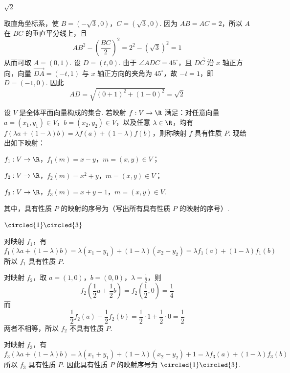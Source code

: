 \begin{answer}
\(\sqrt{2}\)
\end{answer}

\begin{solution}
取直角坐标系，使 \(B=(-\sqrt{3},0)\)，\(C=(\sqrt{3},0)\). 因为 \(AB=AC=2\)，所以 \(A\) 在 \(BC\) 的垂直平分线上，且
\[
AB^2-\left(\frac{BC}{2}\right)^2=2^2-(\sqrt{3})^2=1
\]
从而可取 \(A=(0,1)\). 设 \(D=(t,0)\). 由于 \(\angle ADC=45^\circ\)，且 \(\overrightarrow{DC}\) 沿 \(x\) 轴正方向，向量 \(\overrightarrow{DA}=(-t,1)\) 与 \(x\) 轴正方向的夹角为 \(45^\circ\)，故 \(-t=1\)，即 \(D=(-1,0)\). 因此
\[
AD=\sqrt{(0+1)^2+(1-0)^2}=\sqrt{2}
\]
\end{solution}

\begin{problem}
设 \(V\) 是全体平面向量构成的集合. 若映射 \(f:V\to\R\) 满足：对任意向量 \(a=(x_1,y_1)\in V\)，\(b=(x_2,y_2)\in V\)，以及任意 \(\lambda\in\R\)，均有 \(f\left(\lambda a+(1-\lambda)b\right)=\lambda f(a)+(1-\lambda)f(b)\)，则称映射 \(f\) 具有性质 \(P\). 现给出如下映射：

\begin{circlelist}
\item \(f_1:V\to\R\)，\(f_1(m)=x-y\)，\(m=(x,y)\in V\)；
\item \(f_2:V\to\R\)，\(f_2(m)=x^2+y\)，\(m=(x,y)\in V\)；
\item \(f_3:V\to\R\)，\(f_3(m)=x+y+1\)，\(m=(x,y)\in V\).
\end{circlelist}

其中，具有性质 \(P\) 的映射的序号为\fillinblank{}（写出所有具有性质 \(P\) 的映射的序号）.
\end{problem}

\begin{answer}
\(\circled{1}\circled{3}\)
\end{answer}

\begin{solution}
对映射 \(f_1\)，有
\[
f_1\left(\lambda a+(1-\lambda)b\right)=\lambda(x_1-y_1)+(1-\lambda)(x_2-y_2)=\lambda f_1(a)+(1-\lambda)f_1(b)
\]
所以 \(f_1\) 具有性质 \(P\).

对映射 \(f_2\)，取 \(a=(1,0)\)，\(b=(0,0)\)，\(\lambda=\frac{1}{2}\)，则
\[
f_2\left(\frac{1}{2}a+\frac{1}{2}b\right)=f_2\left(\frac{1}{2},0\right)=\frac{1}{4}
\]
而
\[
\frac{1}{2}f_2(a)+\frac{1}{2}f_2(b)=\frac{1}{2}\cdot1+\frac{1}{2}\cdot0=\frac{1}{2}
\]
两者不相等，所以 \(f_2\) 不具有性质 \(P\).

对映射 \(f_3\)，有
\[
f_3\left(\lambda a+(1-\lambda)b\right)=\lambda(x_1+y_1)+(1-\lambda)(x_2+y_2)+1=\lambda f_3(a)+(1-\lambda)f_3(b)
\]
所以 \(f_3\) 具有性质 \(P\). 因此具有性质 \(P\) 的映射序号为 \(\circled{1}\circled{3}\).
\end{solution}


